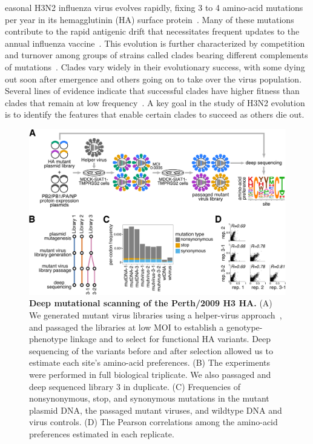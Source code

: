 \documentclass[9pt,twocolumn,twoside]{pnas-new}
\begin{document}
easonal H3N2 influenza virus evolves rapidly, fixing 3 to 4 amino-acid mutations per year in its hemagglutinin (HA) surface protein~\cite{fitch1997long, bhatt2011genomic}.
Many of these mutations contribute to the rapid antigenic drift that necessitates frequent updates to the annual influenza vaccine~\cite{smith2004mapping}.
This evolution is further characterized by competition and turnover among groups of strains called clades bearing different complements of mutations~\cite{bedford2011,strelkowa2012clonal,neher2014predicting,koelle2015effects,bedford2015global}.
Clades vary widely in their evolutionary success, with some dying out soon after emergence and others going on to take over the virus population.
Several lines of evidence indicate that successful clades have higher fitness than clades that remain at low frequency~\cite{bedford2011,strelkowa2012clonal,neher2014predicting,luksza2014predictive}.
A key goal in the study of H3N2 evolution is to identify the features that enable certain clades to succeed as others die out.

\begin{figure}
\centering
\includegraphics[width=12cm]{figs/dms_overview/dms_overview.pdf}
\caption{\label{fig:dms_overview}
{\bf Deep mutational scanning of the Perth/2009 H3 HA.}
(A) We generated mutant virus libraries using a helper-virus approach~\cite{doud2016accurate}, and passaged the libraries at low MOI to establish a genotype-phenotype linkage and to select for functional HA variants.
Deep sequencing of the variants before and after selection allowed us to estimate each site's amino-acid preferences.
(B) The experiments were performed in full biological triplicate.
We also passaged and deep sequenced library 3 in duplicate.
(C) Frequencies of nonsynonymous, stop, and synonymous mutations in the mutant plasmid DNA, the passaged mutant viruses, and wildtype DNA and virus controls.
(D) The Pearson correlations among the amino-acid preferences estimated in each replicate.
}
\end{figure}
\end{document}
